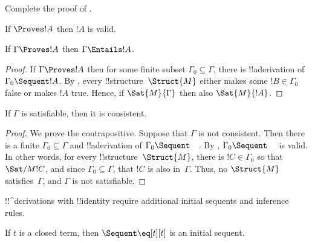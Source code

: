 \begin{prob}
Complete the proof of .
\end{prob}




\begin{cor}
If $\Proves !A$ then $!A$ is valid.
\end{cor}

\begin{cor}
If $\Gamma \Proves !A$ then $\Gamma \Entails !A$.
\end{cor}

\begin{proof}
If $\Gamma \Proves !A$ then for some finite subset $\Gamma_0 \subseteq
\Gamma$, there is !!a{derivation} of $\Gamma_0 \Sequent !A$.  By
, every
!!{structure}~$\Struct{M}$
either makes some $!B \in \Gamma_0$ false or makes $!A$ true.  Hence,
if $\Sat{M}{\Gamma}$ then also
$\Sat{M}{!A}$.
\end{proof}

\begin{cor}
If $\Gamma$ is satisfiable, then it is consistent.
\end{cor}

\begin{proof}
We prove the contrapositive.  Suppose that $\Gamma$ is not consistent.
Then there is a finite $\Gamma_0 \subseteq \Gamma$ and !!a{derivation}
of $\Gamma_0 \Sequent \quad$.  By ,
$\Gamma_0 \Sequent \quad$ is valid.  In other words, for every
!!{structure}~$\Struct{M}$,
there is $!C \in \Gamma_0$ so that
$\Sat/{M}{!C}$, and since $\Gamma_0
\subseteq \Gamma$, that $!C$ is also in~$\Gamma$.  Thus, no
$\Struct{M}$ satisfies~$\Gamma$, and
$\Gamma$ is not satisfiable.
\end{proof}




  



!!^{derivation}s with !!{identity} require additional initial sequents
and inference rules.

\begin{defn}
If $t$ is a closed term, then ${} \Sequent \eq[t][t]$ is an initial sequent.
\end{defn}

